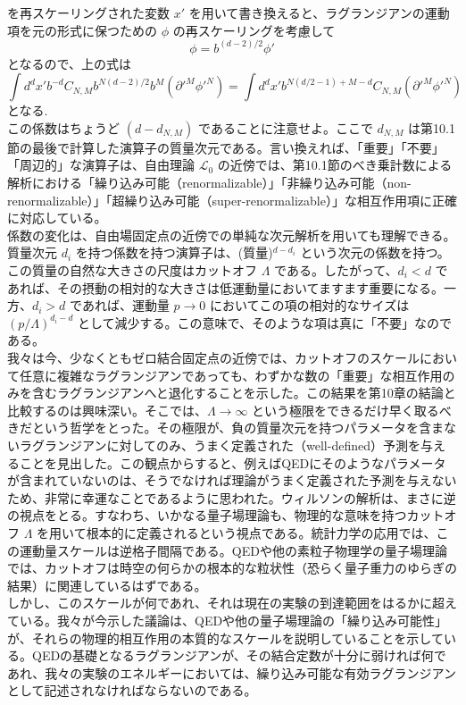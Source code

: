 \documentclass[uplatex,dvipdfmx]{jsarticle}
\begin{document}
を再スケーリングされた変数 $x'$ を用いて書き換えると、ラグランジアンの運動項を元の形式に保つための $\phi$ の再スケーリングを考慮して
\begin{equation}
    \phi = b^{(d-2)/2} \phi'
\end{equation}
となるので、上の式は
\begin{equation}
    \int d^d x' b^{-d} C_{N,M} b^{N(d-2)/2} b^M (\partial'^M \phi'^N) = \int d^d x' b^{N(d/2 - 1) + M - d} C_{N,M} (\partial'^M \phi'^N)
\end{equation}
となる.\\
この係数はちょうど $(d - d_{N,M})$ であることに注意せよ。ここで $d_{N,M}$ は第10.1節の最後で計算した演算子の質量次元である。言い換えれば、「重要」「不要」「周辺的」な演算子は、自由理論 $\mathcal{L}_0$ の近傍では、第10.1節のべき乗計数による解析における「繰り込み可能（renormalizable）」「非繰り込み可能（non-renormalizable）」「超繰り込み可能（super-renormalizable）」な相互作用項に正確に対応している。\\
係数の変化は、自由場固定点の近傍での単純な次元解析を用いても理解できる。質量次元 $d_i$ を持つ係数を持つ演算子は、(質量)$^{d-d_i}$ という次元の係数を持つ。この質量の自然な大きさの尺度はカットオフ $\Lambda$ である。したがって、$d_i < d$ であれば、その摂動の相対的な大きさは低運動量においてますます重要になる。一方、$d_i > d$ であれば、運動量 $p \to 0$ においてこの項の相対的なサイズは $(p/\Lambda)^{d_i - d}$ として減少する。この意味で、そのような項は真に「不要」なのである。\\
我々は今、少なくともゼロ結合固定点の近傍では、カットオフのスケールにおいて任意に複雑なラグランジアンであっても、わずかな数の「重要」な相互作用のみを含むラグランジアンへと退化することを示した。この結果を第10章の結論と比較するのは興味深い。そこでは、$\Lambda \to \infty$ という極限をできるだけ早く取るべきだという哲学をとった。その極限が、負の質量次元を持つパラメータを含まないラグランジアンに対してのみ、うまく定義された（well-defined）予測を与えることを見出した。この観点からすると、例えばQEDにそのようなパラメータが含まれていないのは、そうでなければ理論がうまく定義された予測を与えないため、非常に幸運なことであるように思われた。ウィルソンの解析は、まさに逆の視点をとる。すなわち、いかなる量子場理論も、物理的な意味を持つカットオフ $\Lambda$ を用いて根本的に定義されるという視点である。統計力学の応用では、この運動量スケールは逆格子間隔である。QEDや他の素粒子物理学の量子場理論では、カットオフは時空の何らかの根本的な粒状性（恐らく量子重力のゆらぎの結果）に関連しているはずである。\\
しかし、このスケールが何であれ、それは現在の実験の到達範囲をはるかに超えている。我々が今示した議論は、QEDや他の量子場理論の「繰り込み可能性」が、それらの物理的相互作用の本質的なスケールを説明していることを示している。QEDの基礎となるラグランジアンが、その結合定数が十分に弱ければ何であれ、我々の実験のエネルギーにおいては、繰り込み可能な有効ラグランジアンとして記述されなければならないのである。\\
\end{document}
